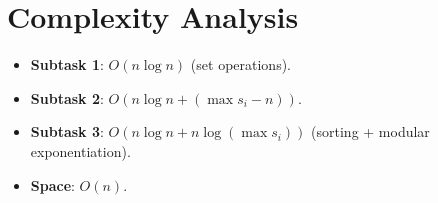 \documentclass[11pt,a4paper]{article}
\begin{document}
\section{Complexity Analysis}

\begin{itemize}
  \item \textbf{Subtask 1}: $O(n \log n)$ (set operations).
  \item \textbf{Subtask 2}: $O(n \log n + (\max s_i - n))$.
  \item \textbf{Subtask 3}: $O(n \log n + n \log(\max s_i))$ (sorting + modular exponentiation).
  \item \textbf{Space}: $O(n)$.
\end{itemize}
\end{document}
